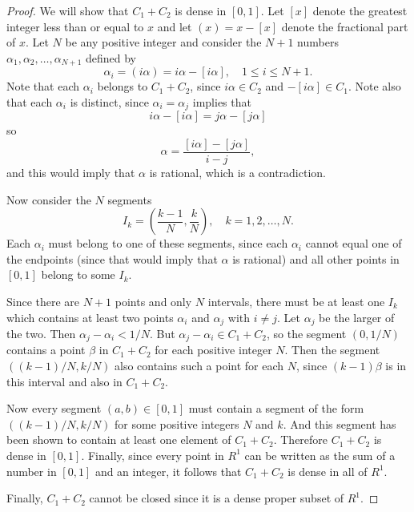 \begin{enumerate}
\begin{proof}
    We will show that $C_1 + C_2$ is dense in $[0,1]$. Let $[x]$
    denote the greatest integer less than or equal to $x$ and let
    $(x) = x - [x]$ denote the fractional part of $x$. Let $N$ be any
    positive integer and consider the $N + 1$ numbers
    $\alpha_1,\alpha_2,\dots,\alpha_{N+1}$ defined by
    \begin{equation*}
      \alpha_i = (i\alpha) = i\alpha - [i\alpha],
      \quad 1\leq i\leq N+1.
    \end{equation*}
    Note that each $\alpha_i$ belongs to $C_1 + C_2$, since
    $i\alpha\in C_2$ and $-[i\alpha]\in C_1$. Note also that each
    $\alpha_i$ is distinct, since $\alpha_i = \alpha_j$ implies that
    \begin{equation*}
      i\alpha - [i\alpha] = j\alpha - [j\alpha]
    \end{equation*}
    so
    \begin{equation*}
      \alpha = \frac{[i\alpha] - [j\alpha]}{i - j},
    \end{equation*}
    and this would imply that $\alpha$ is rational, which is a
    contradiction.

    Now consider the $N$ segments
    \begin{equation*}
      I_k = \left(\frac{k-1}N, \frac{k}N\right),
      \quad k = 1, 2, \dots, N.
    \end{equation*}
    Each $\alpha_i$ must belong to one of these segments, since each
    $\alpha_i$ cannot equal one of the endpoints (since that would
    imply that $\alpha$ is rational) and all other points in $[0,1]$
    belong to some $I_k$.

    Since there are $N+1$ points and only $N$ intervals, there must be
    at least one $I_k$ which contains at least two points $\alpha_i$
    and $\alpha_j$ with $i\neq j$. Let $\alpha_j$ be the larger of the
    two. Then $\alpha_j - \alpha_i < 1/N$. But
    $\alpha_j - \alpha_i\in C_1 + C_2$, so the segment $(0, 1/N)$
    contains a point $\beta$ in $C_1 + C_2$ for each positive integer
    $N$. Then the segment $((k-1)/N, k/N)$ also contains such a point
    for each $N$, since $(k-1)\beta$ is in this interval and also in
    $C_1 + C_2$.

    Now every segment $(a,b)\in[0,1]$ must contain a segment of the
    form $((k-1)/N, k/N)$ for some positive integers $N$ and $k$. And
    this segment has been shown to contain at least one element of
    $C_1 + C_2$. Therefore $C_1 + C_2$ is dense in $[0,1]$. Finally,
    since every point in $R^1$ can be written as the sum of a number
    in $[0,1]$ and an integer, it follows that $C_1 + C_2$ is dense in
    all of $R^1$.

    Finally, $C_1 + C_2$ cannot be closed since it is a dense proper
    subset of $R^1$.
  \end{proof}
\end{enumerate}
